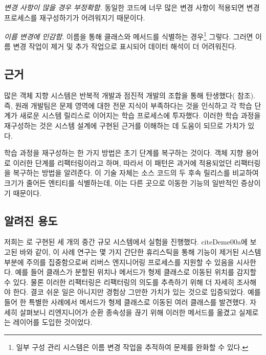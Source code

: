 \documentclass[a4paper,10pt,twoside]{book}
\begin{document}
\begin{bulletlist}
\item \emph{변경 사항이 많을 경우 부정확함.}
동일한 코드에 너무 많은 변경 사항이 적용되면 변경 프로세스를 재구성하기가 어려워지기 때문이다.

\item \emph{이름 변경에 민감함.}
이름을 통해 클래스와 메서드를 식별하는 경우\footnote{일부 구성 관리 시스템은 이름 변경 작업을 추적하여 문제를 완화할 수 있다.} 그렇다. 그러면 이름 변경 작업이 제거 및 추가 작업으로 표시되어 데이터 해석이 더 어려워진다.
\end{bulletlist}


\subsection*{근거}

많은 객체 지향 시스템은 반복적 개발과 점진적 개발의 조합을 통해 탄생했다(\cite{Booc94a} \cite{Gold95a} \cite{Jaco97a} \cite{Reen96a} 참조). 즉, 원래 개발팀은 문제 영역에 대한 전문 지식이 부족하다는 것을 인식하고 각 학습 단계가 새로운 시스템 릴리스로 이어지는 학습 프로세스에 투자했다. 이러한 학습 과정을 재구성하는 것은 시스템 설계에 구현된 근거를 이해하는 데 도움이 되므로 가치가 있다.

학습 과정을 재구성하는 한 가지 방법은 초기 단계를 복구하는 것이다. 객체 지향 용어로 이러한 단계를 리팩터링이라고 하며, 따라서 이 패턴은 과거에 적용되었던 리팩터링을 복구하는 방법을 알려준다. 이 기술 자체는 소스 코드의 두 후속 릴리스를 비교하여 크기가 줄어든 엔티티를 식별하는데, 이는 다른 곳으로 이동한 기능의 일반적인 증상이기 때문이다.

\subsection*{알려진 용도}

저희는 로 구현된 세 개의 중간 규모 시스템에서 실험을 진행했다. cite{Deme00a}에 보고된 바와 같이, 이 사례 연구는 몇 가지 간단한 휴리스틱을 통해 기능이 제거된 시스템 부분에 주의를 집중함으로써 리버스 엔지니어링 프로세스를 지원할 수 있음을 시사한다. 예를 들어 클래스가 분할된 위치나 메서드가 형제 클래스로 이동된 위치를 감지할 수 있다. 물론 이러한 리팩터링은 리팩터링의 의도를 추측하기 위해 더 자세히 조사해야 한다. 결코 쉬운 일은 아니지만 경험상 그만한 가치가 있는 것으로 입증되었다. 예를 들어 한 특별한 사례에서 메서드가 형제 클래스로 이동된 여러 클래스를 발견했다. 자세히 살펴보니 리엔지니어가 순환 종속성을 끊기 위해 이러한 메서드를 옮겼고 실제로는 레이어를 도입한 것이었다.
\end{document}
